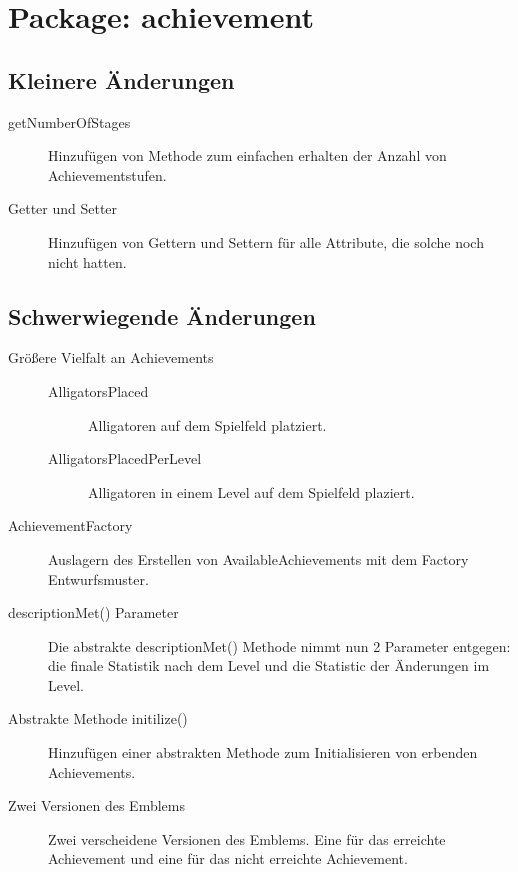 \chapter{Package: achievement}

\section{Kleinere Änderungen}

	\begin{description}
		\item[getNumberOfStages]
		Hinzufügen von Methode zum einfachen erhalten der Anzahl von Achievementstufen.
		\item[Getter und Setter]
		Hinzufügen von Gettern und Settern für alle Attribute, die solche noch nicht hatten.

	\end{description}

\section{Schwerwiegende Änderungen}

	\begin{description}
		\item[Größere Vielfalt an Achievements]
		\begin {description}
			\item[AlligatorsPlaced]
			Alligatoren auf dem Spielfeld platziert.
			\item[AlligatorsPlacedPerLevel]
			Alligatoren in einem Level auf dem Spielfeld plaziert.
		\end {description}

		\item[AchievementFactory]
		Auslagern des Erstellen von AvailableAchievements mit dem Factory Entwurfsmuster.
		
		\item[descriptionMet() Parameter]	
		Die abstrakte descriptionMet() Methode nimmt nun 2 Parameter entgegen: die finale Statistik nach dem Level und die Statistic der Änderungen im Level.		

		\item[Abstrakte Methode initilize()]
		Hinzufügen einer abstrakten Methode zum Initialisieren von erbenden Achievements.

		\item[Zwei Versionen des Emblems]
		Zwei verscheidene Versionen des Emblems. Eine für das erreichte Achievement und eine für das nicht erreichte Achievement.

	\end{description}
